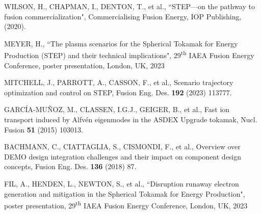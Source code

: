 \documentclass[10pt, a4paper, twoside]{article}
\begin{document}
\fontsize{9}{12}\selectfont
\setlength{\parskip}{0pt}
\begin{thebibliography}{9}

    WILSON, H., CHAPMAN, I., DENTON, T., et al., 
    ``STEP---on the pathway to fusion commercialization", 
    Commercialising Fusion Energy, 
    IOP Publishing, 
    (2020).

    MEYER, H.,
    ``The plasma scenarios for the Spherical Tokamak for Energy Production (STEP) and their technical implications",
    29\textsuperscript{th} IAEA Fusion Energy Conference,
    poster presentation, 
    London, UK, 
    2023

    MITCHELL, J., PARROTT, A., CASSON, F., et al.,
    Scenario trajectory optimization and control on STEP,
    Fusion Eng. Des.
    \textbf{192} 
    (2023) 
    113777.

    GARC\'IA-MU\~NOZ, M., CLASSEN, I.G.J., GEIGER, B., et al., 
    Fast ion transport induced by Alfv\'en eigenmodes in the ASDEX Upgrade tokamak, 
    Nucl. Fusion 
    \textbf{51} 
    (2015) 
    103013.

    BACHMANN, C., CIATTAGLIA, S., CISMONDI, F., et al., 
    Overview over DEMO design integration challenges and their impact on component design concepts, 
    Fusion Eng. Des. 
    \textbf{136} 
    (2018)
    87.

    FIL, A., HENDEN, L., NEWTON, S., et al.,
    ``Disruption runaway electron generation and mitigation in the Spherical Tokamak for Energy Production",
    poster presentation, 
    29\textsuperscript{th} IAEA Fusion Energy Conference,
    London, UK, 
    2023


\end{thebibliography}
\end{document}
